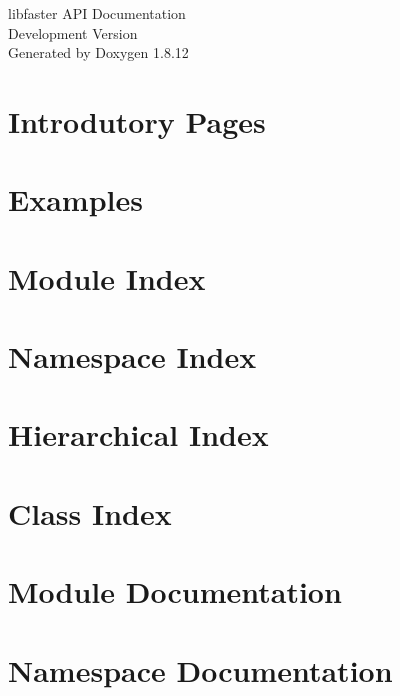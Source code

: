 \documentclass[twoside]{book}
\newcommand{\+}{\discretionary{\mbox{\scriptsize$\hookleftarrow$}}{}{}}
\newcommand{\clearemptydoublepage}{%
  \newpage{\pagestyle{empty}\cleardoublepage}%
}
\begin{document}
\hypersetup{pageanchor=false,
             bookmarksnumbered=true,
             pdfencoding=unicode
            }
\begin{titlepage}
\vspace*{7cm}
\begin{center}%
{\Large libfaster A\+PI Documentation \\[1ex]\large Development Version }\\
\vspace*{1cm}
{\large Generated by Doxygen 1.8.12}\\
\end{center}
\end{titlepage}
\clearemptydoublepage
{}
\tableofcontents
\clearemptydoublepage
{}
\hypersetup{pageanchor=true}

\chapter{Introdutory Pages}
\label{index}\hypertarget{index}{}
\chapter{Examples}
\label{examples}
\hypertarget{examples}{}

\chapter{Module Index}

\chapter{Namespace Index}

\chapter{Hierarchical Index}

\chapter{Class Index}

\chapter{Module Documentation}







\chapter{Namespace Documentation}

\end{document}
